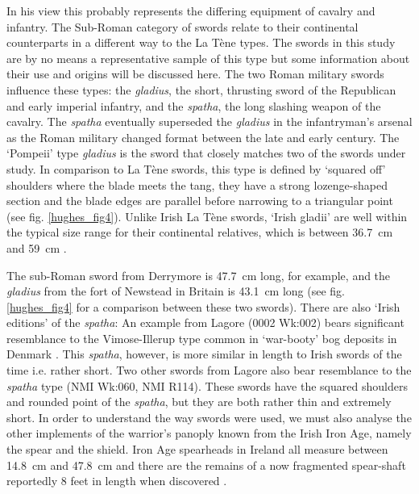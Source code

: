 In his view this probably represents the differing equipment of cavalry and infantry.
The Sub-Roman category of swords relate to their continental counterparts in a different way to the La Tène types. 
The swords in this study are by no means a representative sample of this type but some information about their use and origins will be discussed here. 
The two Roman military swords influence these types: the \emph{gladius}, the short, thrusting sword of the Republican and early imperial infantry, and the \emph{spatha}, the long slashing weapon of the cavalry. 
The \emph{spatha} eventually superseded the \emph{gladius} in the infantryman’s arsenal as the Roman military changed format between the late  and early  century\AD \parencites[61]{Stephenson1999}[212\psq]{Southern2007}.
The ‘Pompeii’ type \emph{gladius} is the sword that closely matches two of the swords under study. 
In comparison to La Tène swords, this type is defined by ‘squared off’ shoulders where the blade meets the tang, they have a strong lozenge-shaped section and the blade edges are parallel before narrowing to a triangular point (see fig. \ref{hughes_fig4}). 
Unlike Irish La Tène swords, ‘Irish gladii’ are well within the typical size range for their continental relatives, which is between \SI{36.7}{\cm} and \SI{59}{\cm} \parencites[200]{Lang1988}[37]{Coulston2007}. 

The sub-Roman sword from Derrymore is \SI{47.7}{\cm} long, for example, 
and the \emph{gladius} from the fort of Newstead in Britain is \SI{43.1}{\cm} long (see fig. \ref{hughes_fig4} for a comparison between these two swords). 
There are also ‘Irish editions’ of the \emph{spatha}: An example from Lagore (0002 Wk:002) bears significant resemblance to the Vimose-Illerup type common in ‘war-booty’ bog deposits in Denmark 
\parencites[28]{CahillWilson2014}[for more information on Danish bog deposits see][]{Pauli-Jensen2009}. 
This \emph{spatha}, however, is more similar in length to Irish swords of the time i.e. rather short. 
Two other swords from Lagore also bear resemblance to the \emph{spatha} type (NMI Wk:060, NMI R114). 
These swords have the squared shoulders and rounded point of the \emph{spatha}, but they are both rather thin and extremely short. 
In order to understand the way swords were used, we must also analyse the other implements of the warrior’s panoply known from the Irish Iron Age, namely the spear and the shield. Iron Age spearheads in Ireland all measure between \SI{14.8}{\cm} and \SI{47.8}{\cm} and there are the remains of a now fragmented spear-shaft reportedly 8 feet in length when discovered \parencite[109--111]{Raftery1983}. 

